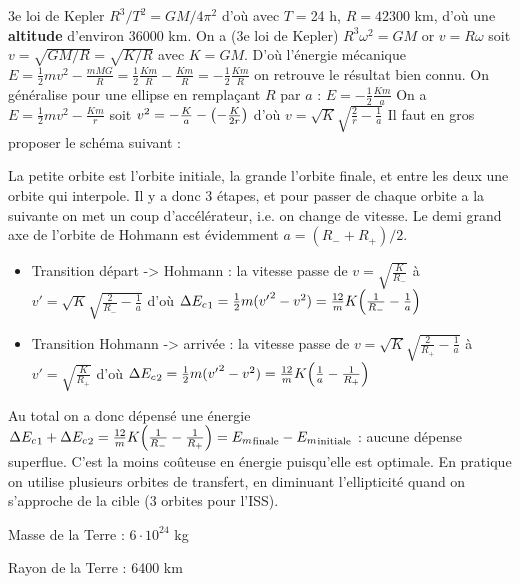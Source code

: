 \begin{solution}

\begin{questions}
    \questioncours 3e loi de Kepler $R^3/T^2 = GM/4\pi^2$ d'où avec $T = $24 h, $R = 42300$ km, d'où une \textbf{altitude} d'environ 36000 km.
    \question On a (3e loi de Kepler) $R^3\omega^2 = GM$ or $v = R\omega$ soit $v = \sqrt{GM/R} = \sqrt{K/R}$ avec $K = GM$. D'où l'énergie mécanique $E = \frac12 m v^2 - \frac{mMG}{R} = \frac12 \frac{Km}{R} - \frac{Km}{R} = -\frac12\frac{Km}{R}$ on retrouve le résultat bien connu. On généralise pour une ellipse en remplaçant $R$ par $a$ : $E = -\frac12\frac{Km}{a}$
    \question On a $E = \frac12m v^2 - \frac{Km}{r}$ soit $v^2 = -\frac{K}{a} - \qty(-\frac{K}{2r})$ d'où $v = \sqrt{K}\sqrt{\frac2r-\frac1a}$
    \question Il faut en gros proposer le schéma suivant :
    La petite orbite est l'orbite initiale, la grande l'orbite finale, et entre les deux une orbite qui interpole.
    Il y a donc 3 étapes, et pour passer de chaque orbite a la suivante on met un coup d'accélérateur, i.e. on change de vitesse.
    Le demi grand axe de l'orbite de Hohmann est évidemment $a = (R_- + R_+)/2$.
    \question 
    \begin{itemize}
        \item Transition départ -> Hohmann : la vitesse passe de $v = \sqrt{\frac{K}{R_-}}$ à $v' = \sqrt{K}\sqrt{\frac{2}{R_-}-\frac1a}$ d'où $\Delta {E_c}_1 = \frac1{2} m ({v'}^2 - v^2) = \frac{12}mK\qty(\frac{1}{R_-} - \frac1a)$
        \item Transition Hohmann -> arrivée : la vitesse passe de $v = \sqrt{K}\sqrt{\frac{2}{R_+}-\frac1a}$ à $v' = \sqrt{\frac{K}{R_+}}$ d'où $\Delta {E_c}_2 = \frac1{2} m ({v'}^2 - v^2) = \frac{12}mK\qty(\frac{1}{a} - \frac1{R_+})$
    \end{itemize}
    Au total on a donc dépensé une énergie $\Delta {E_c}_1 + \Delta {E_c}_2 = \frac{12}mK\qty(\frac{1}{R_-} - \frac1{R_+}) = {E_m}_\text{finale} - {E_m}_\text{initiale}$ : aucune dépense superflue.
    \question C'est la moins coûteuse en énergie puisqu'elle est optimale. En pratique on utilise plusieurs orbites de transfert, en diminuant l'ellipticité quand on s'approche de la cible (3 orbites pour l'ISS).
\end{questions}

Masse de la Terre : $6\cdot 10^{24}$ kg

Rayon de la Terre : 6400 km
\end{solution}